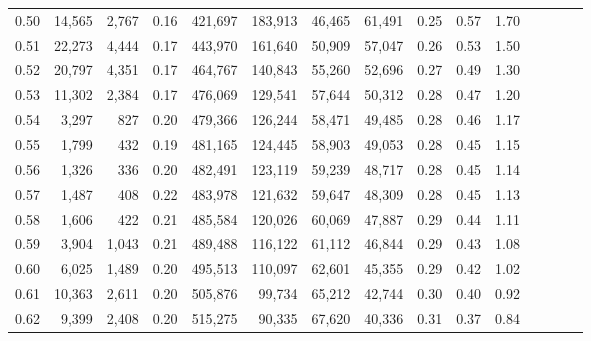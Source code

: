 \begin{tabular}{rrrcrrrrrrrrrrr}
0.50 &  14,565 &   2,767 &                                       0.16 &  421,697 &  183,913 &   46,465 &   61,491 &  0.25 &  0.57 &                         1.70 \\
0.51 &  22,273 &   4,444 &                                       0.17 &  443,970 &  161,640 &   50,909 &   57,047 &  0.26 &  0.53 &                         1.50 \\
0.52 &  20,797 &   4,351 &                                       0.17 &  464,767 &  140,843 &   55,260 &   52,696 &  0.27 &  0.49 &                         1.30 \\
0.53 &  11,302 &   2,384 &                                       0.17 &  476,069 &  129,541 &   57,644 &   50,312 &  0.28 &  0.47 &                         1.20 \\
0.54 &   3,297 &     827 &                                       0.20 &  479,366 &  126,244 &   58,471 &   49,485 &  0.28 &  0.46 &                         1.17 \\
0.55 &   1,799 &     432 &                                       0.19 &  481,165 &  124,445 &   58,903 &   49,053 &  0.28 &  0.45 &                         1.15 \\
0.56 &   1,326 &     336 &                                       0.20 &  482,491 &  123,119 &   59,239 &   48,717 &  0.28 &  0.45 &                         1.14 \\
0.57 &   1,487 &     408 &                                       0.22 &  483,978 &  121,632 &   59,647 &   48,309 &  0.28 &  0.45 &                         1.13 \\
0.58 &   1,606 &     422 &                                       0.21 &  485,584 &  120,026 &   60,069 &   47,887 &  0.29 &  0.44 &                         1.11 \\
0.59 &   3,904 &   1,043 &                                       0.21 &  489,488 &  116,122 &   61,112 &   46,844 &  0.29 &  0.43 &                         1.08 \\
0.60 &   6,025 &   1,489 &                                       0.20 &  495,513 &  110,097 &   62,601 &   45,355 &  0.29 &  0.42 &                         1.02 \\
0.61 &  10,363 &   2,611 &                                       0.20 &  505,876 &   99,734 &   65,212 &   42,744 &  0.30 &  0.40 &                         0.92 \\
0.62 &   9,399 &   2,408 &                                       0.20 &  515,275 &   90,335 &   67,620 &   40,336 &  0.31 &  0.37 &                         0.84 \\

\end{tabular}
